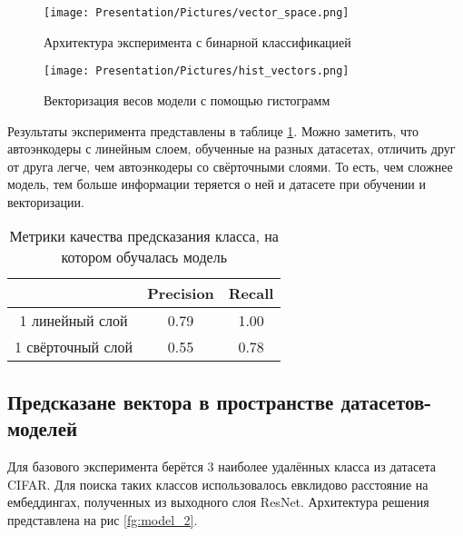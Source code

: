 \documentclass[a4paper, 14pt]{article}
\begin{document}
\begin{center}
\begin{figure}[!ht]
    \texttt{[image: Presentation/Pictures/vector\_space.png]}
    \caption{Архитектура эксперимента с бинарной классификацией}
    \label{fg:model_1}
\end{figure}
\end{center}

\begin{figure}[!ht]
    \begin{center}
    \texttt{[image: Presentation/Pictures/hist\_vectors.png]}
    \caption{Векторизация весов модели с помощью гистограмм}
    \label{fg:vectors}
    \end{center}
\end{figure}

Результаты эксперимента представлены в таблице \ref{table:1}. Можно заметить, что автоэнкодеры с линейным слоем, обученные на разных датасетах, отличить друг от друга легче, чем автоэнкодеры со свёрточными слоями. То есть, чем сложнее модель, тем больше информации теряется о ней и датасете при обучении и векторизации.

\begin{table}[!ht]
\begin{center}
\caption{Метрики качества предсказания класса, на котором обучалась модель}
\begin{tabular}{| c | c | c |}
\hline
& Precision & Recall \\ \hline
1 линейный слой & 0.79 & 1.00 \\ \hline
1 свёрточный слой & 0.55 & 0.78 \\ \hline
\end{tabular}
\label{table:1}
\end{center}
\end{table}

\subsection{Предсказане вектора в пространстве датасетов-моделей}

Для базового эксперимента берётся 3 наиболее удалённых класса из датасета CIFAR. Для поиска таких классов использовалось евклидово расстояние на ембеддингах, полученных из выходного слоя ResNet. Архитектура решения представлена на рис \ref{fg:model_2}.
\end{document}
